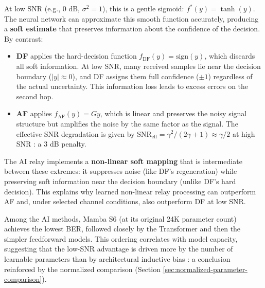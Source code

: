 At low SNR (e.g., 0 dB, \(\sigma^2 = 1\)), this is a gentle sigmoid: \(f^*(y) = \tanh(y)\). The neural network can approximate this smooth function accurately, producing a \textbf{soft estimate} that preserves information about the confidence of the decision. By contrast:

\begin{itemize}
\item
  \textbf{DF} applies the hard-decision function \(f_{\text{DF}}(y) = \text{sign}(y)\), which discards all soft information. At low SNR, many received samples lie near the decision boundary (\(|y| \approx 0\)), and DF assigns them full confidence (\(\pm 1\)) regardless of the actual uncertainty. This information loss leads to excess errors on the second hop.
\item
  \textbf{AF} applies \(f_{\text{AF}}(y) = Gy\), which is linear and preserves the noisy signal structure but amplifies the noise by the same factor as the signal. The effective SNR degradation is given by \(\text{SNR}_{\text{eff}} = \gamma^2 / (2\gamma + 1) \approx \gamma/2\) at high SNR : a 3 dB penalty.
\end{itemize}

The AI relay implements a \textbf{non-linear soft mapping} that is intermediate between these extremes: it suppresses noise (like DF's regeneration) while preserving soft information near the decision boundary (unlike DF's hard decision). This explains why learned non-linear relay processing can outperform AF and, under selected channel conditions, also outperform DF at low SNR.

Among the AI methods, Mamba S6 (at its original 24K parameter count) achieves the lowest BER, followed closely by the Transformer and then the simpler feedforward models. This ordering correlates with model capacity, suggesting that the low-SNR advantage is driven more by the number of learnable parameters than by architectural inductive bias : a conclusion reinforced by the normalized comparison (Section \ref{sec:normalized-parameter-comparison}).

